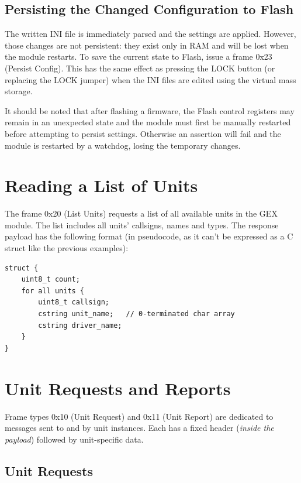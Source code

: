 \subsection{Persisting the Changed Configuration to Flash}

The written INI file is immediately parsed and the settings are applied. However, those changes are not persistent: they exist only in RAM and will be lost when the module restarts. To save the current state to Flash, issue a frame 0x23 (Persist Config). This has the same effect as pressing the LOCK button (or replacing the LOCK jumper) when the INI files are edited using the virtual mass storage.

It should be noted that after flashing a firmware, the Flash control registers may remain in an unexpected state and the module must first be manually restarted before attempting to persist settings. Otherwise an assertion will fail and the module is restarted by a watchdog, losing the temporary changes.



\section{Reading a List of Units}

The frame 0x20 (List Units) requests a list of all available units in the GEX module. The list includes all units' callsigns, names and types. The response payload has the following format (in pseudocode, as it can't be expressed as a C struct like the previous examples):

\begin{verbatim}
struct {
    uint8_t count;
    for all units {
        uint8_t callsign;
        cstring unit_name;   // 0-terminated char array
        cstring driver_name;
    }
}
\end{verbatim}


\section{Unit Requests and Reports}

Frame types 0x10 (Unit Request) and 0x11 (Unit Report) are dedicated to messages sent to and by unit instances. Each has a fixed header (\textit{inside the payload}) followed by unit-specific data.

\subsection{Unit Requests}

